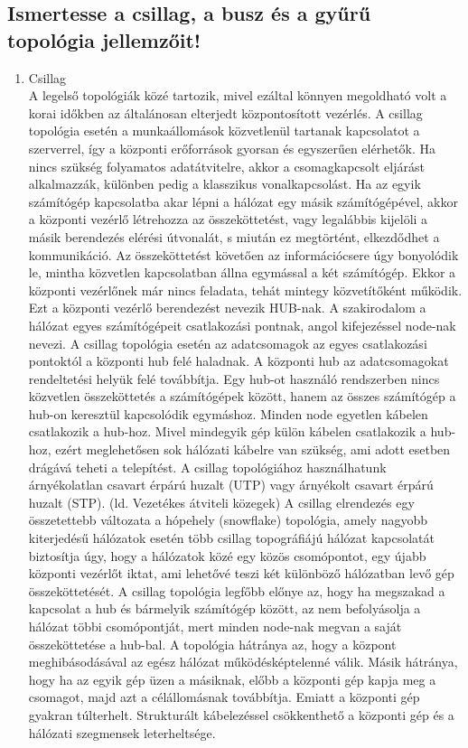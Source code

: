 \documentclass[12pt, a4paper]{article}
\begin{document}
\subsection{Ismertesse a csillag, a busz és a gyűrű topológia jellemzőit!}
\begin{enumerate}
\item
Csillag\\
A legelső topológiák közé tartozik, mivel ezáltal könnyen megoldható volt a korai időkben az általánosan elterjedt központosított vezérlés. A csillag topológia esetén a munkaállomások közvetlenül tartanak kapcsolatot a szerverrel, így a központi erőforrások gyorsan és egyszerűen elérhetők. Ha nincs szükség folyamatos adatátvitelre, akkor a csomagkapcsolt eljárást alkalmazzák, különben pedig a klasszikus vonalkapcsolást. Ha az egyik számítógép kapcsolatba akar lépni a hálózat egy másik számítógépével, akkor a központi vezérlő létrehozza az összeköttetést, vagy legalábbis kijelöli a másik berendezés elérési útvonalát, s miután ez megtörtént, elkezdődhet a kommunikáció. Az összeköttetést követően az információcsere úgy bonyolódik le, mintha közvetlen kapcsolatban állna egymással a két számítógép. Ekkor a központi vezérlőnek már nincs feladata, tehát mintegy közvetítőként működik. Ezt a központi vezérlő berendezést nevezik HUB-nak. A szakirodalom a hálózat egyes számítógépeit csatlakozási pontnak, angol kifejezéssel node-nak nevezi. A csillag topológia esetén az adatcsomagok az egyes csatlakozási pontoktól a központi hub felé haladnak. A központi hub az adatcsomagokat rendeltetési helyük felé továbbítja. Egy hub-ot használó rendszerben nincs közvetlen összeköttetés a számítógépek között, hanem az összes számítógép a hub-on keresztül kapcsolódik egymáshoz. Minden node egyetlen kábelen csatlakozik a hub-hoz. Mivel mindegyik gép külön kábelen csatlakozik a hub-hoz, ezért meglehetősen sok hálózati kábelre van szükség, ami adott esetben drágává teheti a telepítést. A csillag topológiához használhatunk árnyékolatlan csavart érpárú huzalt (UTP) vagy árnyékolt csavart érpárú huzalt (STP). (ld. Vezetékes átviteli közegek) A csillag elrendezés egy összetettebb változata a hópehely (snowflake) topológia, amely nagyobb kiterjedésű hálózatok esetén több csillag topográfiájú hálózat kapcsolatát biztosítja úgy, hogy a hálózatok közé egy közös csomópontot, egy újabb központi vezérlőt iktat, ami lehetővé teszi két különböző hálózatban levő gép összeköttetését. A csillag topológia legfőbb előnye az, hogy ha megszakad a kapcsolat a hub és bármelyik számítógép között, az nem befolyásolja a hálózat többi csomópontját, mert minden node-nak megvan a saját összeköttetése a hub-bal. A topológia hátránya az, hogy a központ meghibásodásával az egész hálózat működésképtelenné válik. Másik hátránya, hogy ha az egyik gép üzen a másiknak, előbb a központi gép kapja meg a csomagot, majd azt a célállomásnak továbbítja. Emiatt a központi gép gyakran túlterhelt. Strukturált kábelezéssel csökkenthető a központi gép és a hálózati szegmensek leterheltsége.

\end{enumerate}
\end{document}
